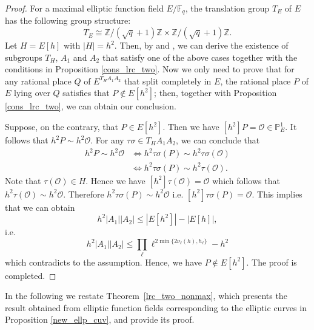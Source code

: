 \documentclass[journal,12pt,onecolumn]{IEEEtran}
\begin{document}
\begin{proof}
    For a maximal elliptic function field \(E/\mathbb{F}_q\), the translation group \(T_E\) of \(E\) has the following group structure:
    \[
    T_E \cong \mathbb{Z}/(\sqrt{q} + 1)\mathbb{Z} \times \mathbb{Z}/(\sqrt{q} + 1)\mathbb{Z}.
    \]
    Let \(H = E[h]\) with \(|H| = h^2\). Then, by \cite{Optimal_Locally_Repairable_Codes_Via_Elliptic_Curves} and \cite[Thm. 1.2]{MA2023105686}, we can derive the existence of subgroups \(T_H\), \(A_1\) and \(A_2\) that satisfy one of the above cases together with the conditions in Proposition \ref{cons_lrc_two}. Now we only need to prove that for any rational place \(Q\) of \( E^{T_HA_1A_2} \) that split completely in \( E \), the rational place $P$ of $E$ lying over $Q$ satisfies that \(P\notin E[h^2]\); then, together with Proposition \ref{cons_lrc_two}, we can obtain our conclusion.

    Suppose, on the contrary, that \(P\in E[h^2]\). Then we have \([h^2]P = \mathcal{O}\in \mathbb{P}_E^1\). It follows that \(h^2P\sim h^2\mathcal{O}\). For any \(\tau\sigma\in T_HA_1A_2\), we can conclude that
    \begin{align*}
        h^2P\sim h^2\mathcal{O} &\Longleftrightarrow h^2\tau\sigma(P)\sim h^2\tau\sigma(\mathcal{O})\\
        &\Longleftrightarrow h^2\tau\sigma(P)\sim h^2\tau(\mathcal{O}).
    \end{align*}
    Note that \(\tau(\mathcal{O})\in H\). Hence we have \([h^2]\tau(\mathcal{O}) = \mathcal{O}\) which follows that \(h^2\tau(\mathcal{O})\sim h^2\mathcal{O}\). Therefore \(h^2\tau\sigma(P)\sim h^2\mathcal{O}\) i.e. \([h^2]\tau\sigma(P) = \mathcal{O}\). This implies that we can obtain
    \[
         h^2|A_1||A_2|\le |E[h^2]|-|E[h]|,
    \]
    i.e.
    \[
        h^2|A_1||A_2|\le\prod_\ell \ell^{2\min\{2\nu_\ell(h),h_\ell\}}-h^2
    \]
    which contradicts to the assumption. Hence, we have \(P\notin E[h^2]\). The proof is completed. 
\end{proof}

In the following we restate Theorem~\ref{lrc_two_nonmax}, which presents the result obtained from elliptic function fields corresponding to the elliptic curves in Proposition \ref{new_ellp_cuv}, and provide its proof. 
\end{document}
